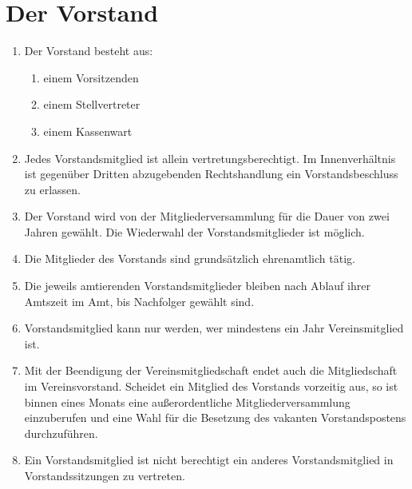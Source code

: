 \documentclass[a4paper,ngerman]{scrartcl}
\begin{document}
\section{Der Vorstand}
\begin{enumerate}
\item Der Vorstand besteht aus:
\begin{enumerate}
\item einem Vorsitzenden
\item einem Stellvertreter
\item einem Kassenwart
\end{enumerate}
\item Jedes Vorstandsmitglied ist allein vertretungsberechtigt. Im Innenverhältnis ist gegenüber Dritten abzugebenden Rechtshandlung ein Vorstandsbeschluss zu erlassen.
\item Der Vorstand wird von der Mitgliederversammlung für die Dauer von zwei Jahren gewählt. Die Wiederwahl der Vorstandsmitglieder ist möglich.
\item Die Mitglieder des Vorstands sind grundsätzlich ehrenamtlich tätig.
\item Die jeweils amtierenden Vorstandsmitglieder bleiben nach Ablauf ihrer Amtszeit im Amt, bis Nachfolger gewählt sind.
\item Vorstandsmitglied kann nur werden, wer mindestens ein Jahr Vereinsmitglied ist.
\item Mit der Beendigung der Vereinsmitgliedschaft endet auch die Mitgliedschaft im Vereinsvorstand. Scheidet ein Mitglied des Vorstands vorzeitig aus, so ist binnen eines
Monats eine außerordentliche Mitgliederversammlung einzuberufen und eine Wahl für die Besetzung des vakanten Vorstandspostens durchzuführen.
\item Ein Vorstandsmitglied ist nicht berechtigt ein anderes Vorstandsmitglied in Vorstandssitzungen zu vertreten.
\end{enumerate}
\end{document}
